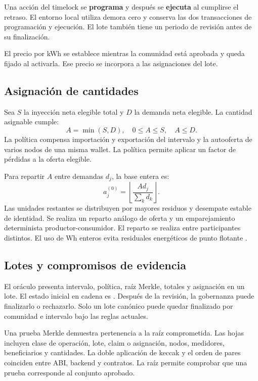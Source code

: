 Una acción del timelock se \textbf{programa} y después se \textbf{ejecuta} al cumplirse el retraso. El entorno local utiliza demora cero y conserva las dos transacciones de programación y ejecución. El lote también tiene un periodo de revisión antes de su finalización.

El precio por kWh se establece mientras la comunidad está aprobada y queda fijado al activarla. Ese precio se incorpora a las asignaciones del lote.

\subsection{Asignación de cantidades}
Sea $S$ la inyección neta elegible total y $D$ la demanda neta elegible. La cantidad asignable cumple:
\begin{equation}
A=\min(S,D),\quad 0\leq A\leq S,\quad A\leq D.
\end{equation}
La política compensa importación y exportación del intervalo y la autooferta de varios nodos de una misma wallet. La política permite aplicar un factor de pérdidas a la oferta elegible.

Para repartir $A$ entre demandas $d_j$, la base entera es:
\begin{equation}
a_j^{(0)}=\left\lfloor\frac{A d_j}{\sum_k d_k}\right\rfloor.
\end{equation}
Las unidades restantes se distribuyen por mayores residuos y desempate estable de identidad. Se realiza un reparto análogo de oferta y un emparejamiento determinista productor-consumidor. El reparto se realiza entre participantes distintos. El uso de Wh enteros evita residuales energéticos de punto flotante \citep{allocation,settlement}.

\subsection{Lotes y compromisos de evidencia}
El oráculo presenta intervalo, política, raíz Merkle, totales y asignación en un lote. El estado inicial en cadena es . Después de la revisión, la gobernanza puede finalizarlo o rechazarlo. Solo un lote canónico puede quedar finalizado por comunidad e intervalo bajo las reglas actuales.

Una prueba Merkle demuestra pertenencia a la raíz comprometida. Las hojas incluyen clase de operación, lote, claim o asignación, nodos, medidores, beneficiarios y cantidades. La doble aplicación de keccak y el orden de pares coinciden entre ABI, backend y contratos. La raíz permite comprobar que una prueba corresponde al conjunto aprobado.

